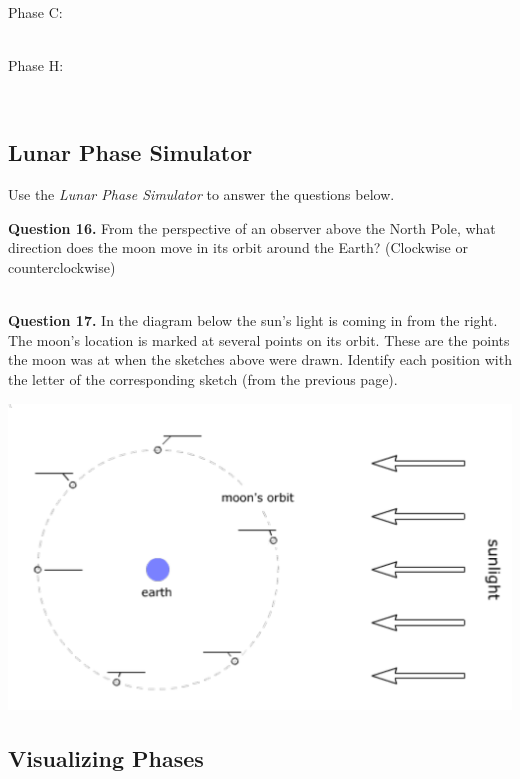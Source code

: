 \documentclass[11pt]{article}
\begin{document}
\hrulefill\\
\noindent
Phase C:
\vspace*{0.5cm}

\hrulefill\\
\noindent
Phase H:
\vspace*{0.5cm}

\hrulefill\\

\newpage

\subsection{Lunar Phase Simulator}

Use the \emph{Lunar Phase Simulator} to answer the questions below.

\noindent
\textbf{Question 16.} 
From the perspective of an observer above the North Pole, what direction does
the moon move in its orbit around the Earth? (Clockwise or counterclockwise)
\vspace*{0.5cm}

\hrulefill\\
\noindent
\textbf{Question 17.} In the diagram below the sun's light is coming in from the right. The moon's location is marked at several points on its orbit. These are the points the moon was at when the sketches above were drawn. Identify each position with the letter of the corresponding sketch (from the previous page).

\begin{center}
\includegraphics{moon_orbit.png}
\end{center}

\subsection{Visualizing Phases}
\end{document}
